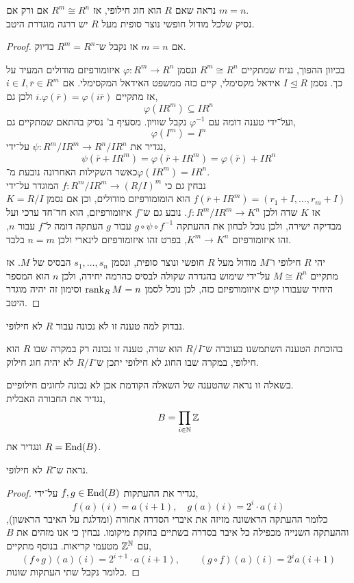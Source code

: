 \subquestion{}
נראה שאם $R$ הוא חוג חילופי, אז $R^m \cong R^n$ אם ורק אם $m = n$. \\
נסיק שלכל מודול חופשי נוצר סופית מעל $R$ יש דרגה מוגדרת היטב.
\begin{proof}
	אם $m = n$ אז נקבל ש־$R^m = R^n$ בדיוק.

	בכיוון ההפוך, נניח שמתקיים $R^m \cong R^n$ ונסמן $\varphi : R^m \to R^n$ איזומורפיזם מודולים המעיד על כך.
	נסמן $I \trianglelefteq R$ אידאל מקסימלי, קיים כזה ממשפט האידאל המקסימלי.
	אם $i \in I, \bar{r} \in R^m$ אז מתקיים $i . \varphi(\bar{r}) = \varphi(i \bar{r})$ ולכן גם,
	\[
		\varphi(I R^m)
		\subseteq I R^n
	\]
	ועל־ידי טענה דומה עם $\varphi^{-1}$ נקבל שוויון.
	מסעיף ב' נסיק בהתאם שמתקיים גם,
	\[
		\varphi(I^m)
		= I^n
	\]
	נגדיר את $\psi : R^m / I R^m \to R^n / I R^n$ על־ידי,
	\[
		\psi(\bar{r} + I R^m)
		= \varphi(\bar{r} + I R^m)
		= \varphi(\bar{r}) + I R^n
	\]
	כאשר השקילות האחרונה נובעת מ־$\varphi(I R^m) = I R^n$. \\
	נבחין גם כי $f : R^m / I R^m \to {(R / I)}^m$ המוגדר על־ידי $f(\bar{r} + I R^m) = (r_1 + I, \ldots, r_m + I)$ הוא הומומורפיזם מודולים, וכן אם נסמן $K = R / I$ אז $K$ שדה ולכן $f : R^m / I R^m \to K^n$.
	נובע גם ש־$f$ איזומורפיזם, הוא חד־חד ערכי ועל מבדיקה ישירה, ולכן נוכל לבחון את ההעתקה $g \circ \psi \circ f^{-1}$ עבור $g$ העתקה דומה ל־$f$ עבור $n$, זהו איזומורפיזם $K^m \to K^n$,
	בפרט זהו איזומורפיזם לינארי ולכן $n = m$ בלבד.

	יהי $R$ חילופי ו־$M$ מודול מעל $R$ חופשי ונוצר סופית, ונסמן $s_1, \ldots, s_n$ הבסיס של $M$.
	אז מתקיים $M \cong R^n$ על־ידי שימוש בהגדרה שקולה לבסיס כהרמה יחידה, ולכן $n$ הוא המספר היחיד שעבורו קיים איזומורפיזם כזה, לכן נוכל לסמן $\operatorname{rank}_R M = n$ וסימון זה יהיה מוגדר היטב.
\end{proof}

\subquestion{}
נבדוק למה טענה זו לא נכונה עבור $R$ לא חילופי.
\begin{solution}
	בהוכחת הטענה השתמשנו בעובדה ש־$R / I$ הוא שדה, טענה זו נכונה רק במקרה שבו $R$ הוא חילופי, במקרה שבו החוג לא חילופי יתכן ש־$R / I$ לא יהיה חוג חילוק.
\end{solution}

\question{}
בשאלה זו נראה שהטענה של השאלה הקודמת אכן לא נכונה לחוגים חילופיים. \\
נגדיר את החבורה האבלית,
\[
	B
	= \prod_{i \in \mathbb{N}} \mathbb{Z}
\]
ונגדיר את $R = \operatorname{End}(B)$.

\subquestion{}
נראה ש־$R$ לא חילופי.
\begin{proof}
	נגדיר את ההעתקות $f, g \in \operatorname{End}(B)$ על־ידי,
	\[
		f(a)(i) = a(i + 1),
		\quad
		g(a)(i) = 2^i \cdot a(i)
	\]
	כלומר ההעתקה הראשונה מזיזה את איברי הסדרה אחורה (ומדלגת על האיבר הראשון), וההעתקה השנייה מכפילה כל איבר בסדרה בשתיים בחזקת מיקומו.
	נבחין כי אנו מזהים את $B$ עם $\mathbb{Z}^{\mathbb{N}}$ מטעמי קריאות.
	בנוסף מתקיים,
	\[
		(f \circ g)(a)(i) = 2^{i + 1} \cdot a(i + 1),
		\qquad
		(g \circ f)(a)(i) = 2^i a(i + 1)
	\]
	כלומר נקבל שתי העתקות שונות.
\end{proof}

